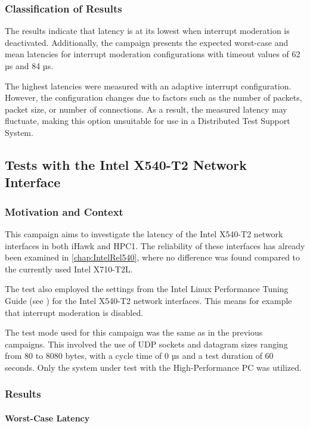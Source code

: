 \subsubsection{Classification of Results}
The results indicate that latency is at its lowest when interrupt moderation is deactivated. Additionally, the campaign presents the expected worst-case and mean latencies for interrupt moderation configurations with timeout values of 62 µs and 84 µs.

The highest latencies were measured with an adaptive interrupt configuration. However, the configuration changes due to factors such as the number of packets, packet size, or number of connections. As a result, the measured latency may fluctuate, making this option unsuitable for use in a Distributed Test Support System.

\subsection{Tests with the Intel X540-T2 Network Interface}
\subsubsection{Motivation and Context}

This campaign aims to investigate the latency of the Intel X540-T2 network interfaces in both iHawk and HPC1. The reliability of these interfaces has already been examined in \ref{chap:IntelRel540}, where no difference was found compared to the currently used Intel X710-T2L.

The test also employed the settings from the Intel Linux Performance Tuning Guide (see \cite{intermod03}) for the Intel X540-T2 network interfaces. This means for example that interrupt moderation is disabled.

The test mode used for this campaign was the same as in the previous campaigns. This involved the use of UDP sockets and datagram sizes ranging from 80 to 8080 bytes, with a cycle time of 0 µs and a test duration of 60 seconds. Only the system under test with the High-Performance PC was utilized.

\subsubsection{Results}
\paragraph{Worst-Case Latency}

